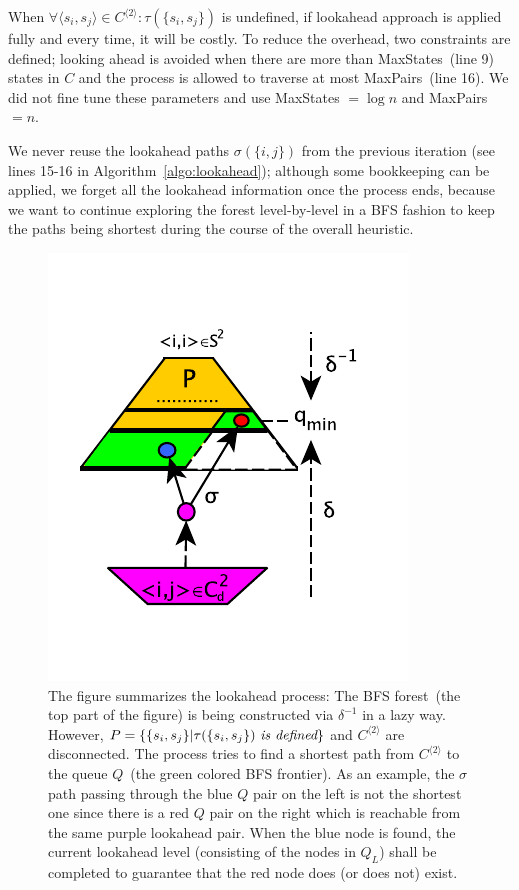 \documentclass[12pt]{article}
\newcommand{\comment}[2]{{\color{red}{\bf (#1: #2)}}}
\begin{document}
When $\forall \langle s_i,s_j \rangle \in C^{\langle 2 \rangle}: \tau(\{s_i,s_j \})$ is undefined, if lookahead approach is applied fully and every time, it will be costly. To reduce the overhead, two constraints are defined; looking ahead is avoided when there are more than {\sc MaxStates}~(line 9)  states in $C$ and the process is allowed to traverse at most {\sc MaxPairs}~(line 16). We did not fine tune these parameters and use {\sc MaxStates} $= \log n$ and {\sc MaxPairs} $= n$. 

We never reuse the lookahead paths $\sigma(\{ i, j \})$ from the previous iteration (see lines 15-16 in Algorithm~\ref{algo:lookahead}); although some bookkeeping can be applied, we forget all the lookahead information once the process ends, because we want to continue exploring the forest level-by-level in a BFS fashion to keep the paths being shortest during the course of the overall heuristic. 



\begin{figure}[ht]
\centering
\includegraphics{figs/la.pdf}
\caption{The figure summarizes the lookahead process: The BFS forest~(the top part of the figure) is being constructed via $\delta^{-1}$ in a lazy way. However, $P = \{ \{s_i, s_j \} | \tau(\{s_i, s_j \})~ \mbox{\em is defined} \}$ and $C^{\langle 2 \rangle}$ are disconnected. The process tries to find a shortest path from $C^{\langle 2 \rangle}$ to the queue $Q$~(the green colored BFS frontier). As an example, the $\sigma$ path passing through the blue $Q$ pair on the left is not the shortest one since there is a red $Q$ pair on the right which is reachable from the same purple lookahead pair. When the blue node is found, the current lookahead level (consisting of the nodes in $Q_L$) shall be completed to guarantee that the red node does (or does not) exist.\comment{sertac}{notation degisecek}}
\label{fig:lookahead}
\vspace*{-3ex}
\end{figure}
\renewcommand{\baselinestretch}{1}
\end{document}
